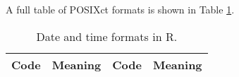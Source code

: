 \documentclass[
  11pt,
]{krantz}
\begin{document}
A full table of POSIXct formats is shown in Table \ref{tab:date-format}.

\begin{table}
\caption{\label{tab:date-format} Date and time formats in R.}\tabularnewline
\begin{tabular}{llll}
\toprule
\begin{minipage}[b]{0.05\columnwidth}\raggedright
Code\strut
\end{minipage} & \begin{minipage}[b]{0.31\columnwidth}\raggedright
Meaning\strut
\end{minipage} & \begin{minipage}[b]{0.05\columnwidth}\raggedright
Code\strut
\end{minipage} & \begin{minipage}[b]{0.47\columnwidth}\raggedright
Meaning\strut
\end{minipage}\tabularnewline
\midrule


\end{tabular}
\end{table}
\end{document}
